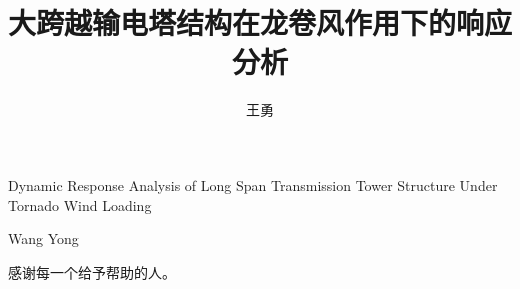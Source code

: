 \documentclass[algorithmlist,figurelist,tablelist,nomlist,masters]{seuthesix}
\begin{document}
\title{大跨越输电塔结构在龙卷风作用下的响应分析}{}{Dynamic Response Analysis of Long Span Transmission Tower Structure Under Tornado Wind Loading}{}
\author{王勇}{Wang Yong}
\authorizedate{\today}
\committeechair{}
\reviewer{}{}

\makebigcover
\makecover

\begin{abstract}{}
\end{abstract}

\begin{englishabstract}{}
\end{englishabstract}

\tableofcontents

\mainmatter






\acknowledgement
感谢每一个给予帮助的人。


\appendix


\end{document}
